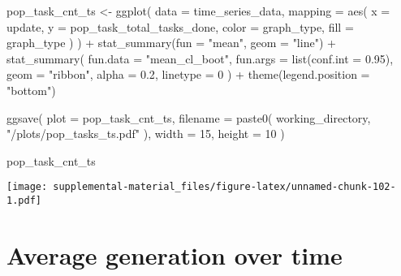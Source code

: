 \documentclass[
]{book}
\newenvironment{Shaded}{\begin{snugshade}}{\end{snugshade}}
\newcommand{\AttributeTok}[1]{\textcolor[rgb]{0.77,0.63,0.00}{#1}}
\newcommand{\DecValTok}[1]{\textcolor[rgb]{0.00,0.00,0.81}{#1}}
\newcommand{\FloatTok}[1]{\textcolor[rgb]{0.00,0.00,0.81}{#1}}
\newcommand{\FunctionTok}[1]{\textcolor[rgb]{0.00,0.00,0.00}{#1}}
\newcommand{\NormalTok}[1]{#1}
\newcommand{\OtherTok}[1]{\textcolor[rgb]{0.56,0.35,0.01}{#1}}
\newcommand{\SpecialCharTok}[1]{\textcolor[rgb]{0.00,0.00,0.00}{#1}}
\newcommand{\StringTok}[1]{\textcolor[rgb]{0.31,0.60,0.02}{#1}}
\begin{document}
\begin{Shaded}
\begin{Highlighting}[]
\NormalTok{pop\_task\_cnt\_ts }\OtherTok{\textless{}{-}} \FunctionTok{ggplot}\NormalTok{(}
    \AttributeTok{data =}\NormalTok{ time\_series\_data,}
    \AttributeTok{mapping =} \FunctionTok{aes}\NormalTok{(}
      \AttributeTok{x =}\NormalTok{ update,}
      \AttributeTok{y =}\NormalTok{ pop\_task\_total\_tasks\_done,}
      \AttributeTok{color =}\NormalTok{ graph\_type,}
      \AttributeTok{fill =}\NormalTok{ graph\_type}
\NormalTok{    )}
\NormalTok{  ) }\SpecialCharTok{+}
  \FunctionTok{stat\_summary}\NormalTok{(}\AttributeTok{fun =} \StringTok{"mean"}\NormalTok{, }\AttributeTok{geom =} \StringTok{"line"}\NormalTok{) }\SpecialCharTok{+}
  \FunctionTok{stat\_summary}\NormalTok{(}
    \AttributeTok{fun.data =} \StringTok{"mean\_cl\_boot"}\NormalTok{,}
    \AttributeTok{fun.args =} \FunctionTok{list}\NormalTok{(}\AttributeTok{conf.int =} \FloatTok{0.95}\NormalTok{),}
    \AttributeTok{geom =} \StringTok{"ribbon"}\NormalTok{,}
    \AttributeTok{alpha =} \FloatTok{0.2}\NormalTok{,}
    \AttributeTok{linetype =} \DecValTok{0}
\NormalTok{  ) }\SpecialCharTok{+}
  \FunctionTok{theme}\NormalTok{(}\AttributeTok{legend.position =} \StringTok{"bottom"}\NormalTok{)}

\FunctionTok{ggsave}\NormalTok{(}
  \AttributeTok{plot =}\NormalTok{ pop\_task\_cnt\_ts,}
  \AttributeTok{filename =} \FunctionTok{paste0}\NormalTok{(}
\NormalTok{    working\_directory,}
    \StringTok{"/plots/pop\_tasks\_ts.pdf"}
\NormalTok{  ),}
  \AttributeTok{width =} \DecValTok{15}\NormalTok{,}
  \AttributeTok{height =} \DecValTok{10}
\NormalTok{)}

\NormalTok{pop\_task\_cnt\_ts}
\end{Highlighting}
\end{Shaded}

\texttt{[image: supplemental-material\_files/figure-latex/unnamed-chunk-102-1.pdf]}

\hypertarget{average-generation-over-time-1}{%
\section{Average generation over time}\label{average-generation-over-time-1}}
\end{document}
